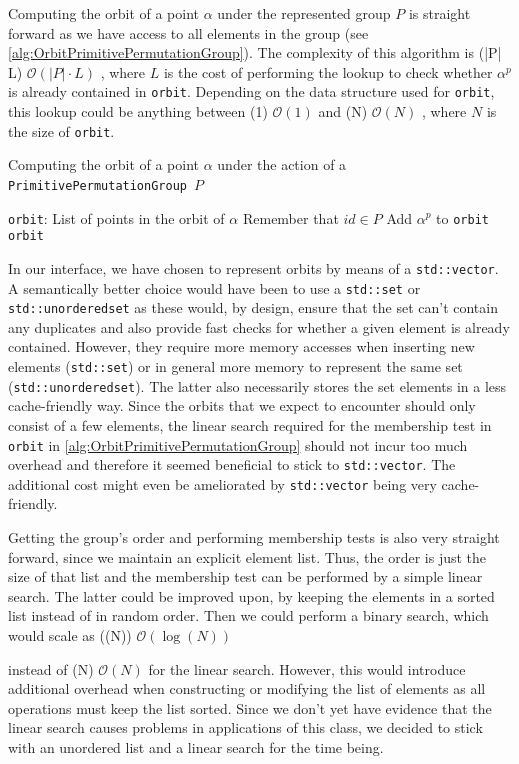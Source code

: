 \documentclass[parskip=half]{scrartcl}
\newcommand{\ifMathMode}[2]{%
	\relax\ifmmode%
		#1%
	\else%
		#2%
	\fi%
}
\newcommand{\code}[1]{\texttt{#1}}
\newcommand{\class}[1]{\code{#1}}
\newcommand{\complexity}[1]{\ifMathMode{\mathcal{O}(#1)}{$\mathcal{O}(#1)$}}
\begin{document}
	Computing the orbit of a point $\alpha$ under the represented group $P$ is straight forward as we have access to all elements in the group (see
	\cref{alg:OrbitPrimitivePermutationGroup}). The complexity of this algorithm is \complexity{|P| \cdot L}, where $L$ is the cost of performing the
	lookup to check whether $\alpha^p$ is already contained in \code{orbit}. Depending on the data structure used for \code{orbit}, this lookup could
	be anything between \complexity{1} and \complexity{N}, where $N$ is the size of \code{orbit}.

	\begin{algorithm}
		\caption{Computing the orbit of a point $\alpha$ under the action of a \class{PrimitivePermutationGroup}~$P$}
		\label{alg:OrbitPrimitivePermutationGroup}

		\begin{algorithmic}[1]
			\Function{Orbit}{\class{PrimitivePermutationGroup} $P$, point $\alpha$}
				\State \code{orbit}: List of points in the orbit of $\alpha$
				\Comment Remember that $id \in P$
					\If{$\alpha^p \notin \code{orbit}$}
						\State Add $\alpha^p$ to \code{orbit}
					\EndIf
				\EndFor
				\State \Return \code{orbit}
			\EndFunction
		\end{algorithmic}
	\end{algorithm}

	In our interface, we have chosen to represent orbits by means of a \code{std::vector}. A semantically better choice would have been to use a
	\code{std::set} or \code{std::unordered\textunderscore{}set} as these would, by design, ensure that the set can't contain any duplicates and also
	provide fast checks for whether a given element is already contained. However, they require more memory accesses when inserting new elements
	(\code{std::set}) or in general more memory to represent the same set (\code{std::unordered\textunderscore{}set}). The latter also necessarily
	stores the set elements in a less cache-friendly way. Since the orbits that we expect to encounter should only consist of a few elements, the
	linear search required for the membership test in \code{orbit} in \cref{alg:OrbitPrimitivePermutationGroup} should not incur too much overhead and
	therefore it seemed beneficial to stick to \code{std::vector}. The additional cost might even be ameliorated by \code{std::vector} being very
	cache-friendly.

	Getting the group's order and performing membership tests is also very straight forward, since we maintain an explicit element list. Thus, the
	order is just the size of that list and the membership test can be performed by a simple linear search. The latter could be improved upon, by
	keeping the elements in a sorted list instead of in random order. Then we could perform a binary search, which would scale as \complexity{\log(N)}
	instead of \complexity{N} for the linear search. However, this would introduce additional overhead when constructing or modifying the list of
	elements as all operations must keep the list sorted. Since we don't yet have evidence that the linear search causes problems in applications of
	this class, we decided to stick with an unordered list and a linear search for the time being.
\end{document}
